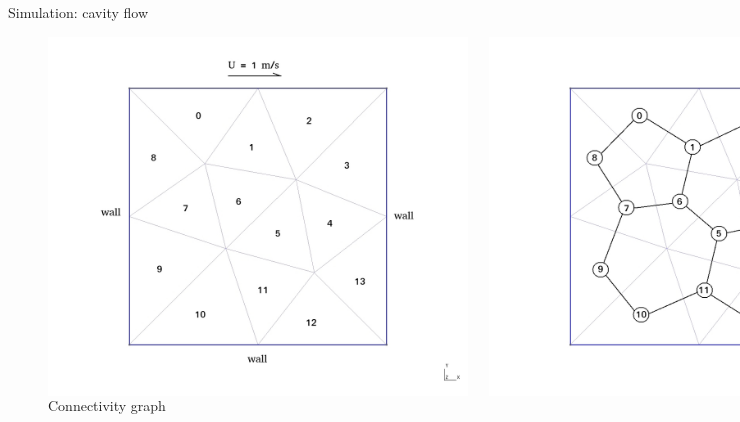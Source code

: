 \documentclass[xcolor=dvipsnames]{beamer}
\begin{document}
\begin{frame}{Simulation: cavity flow}
\begin{figure}
  \centering
  \begin{columns}
    \centering
    \caption {Geometry and mesh}
    \includegraphics[width=0.99\textwidth]{cavity_2d_tet_i}
    \centering
    \caption {Connectivity graph}
    \includegraphics[width=0.99\textwidth]{cavity_2d_tet_d}
  \end{columns}
\end{figure}
\end{frame}
\end{document}
